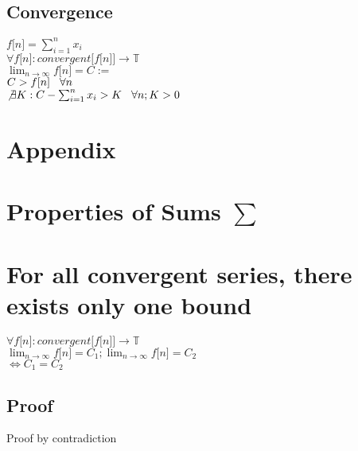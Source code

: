\documentclass[11pt]{article}
\begin{document}
\subsection{Convergence}
\begin{center}
$ f \lbrack n \rbrack = \sum_{i=1}^{n} x_i$
\\ \vspace{2mm}
$\forall f \lbrack n \rbrack : convergent \lbrack f \lbrack n \rbrack \rbrack \rightarrow \mathbb{T}$
\\ \vspace{2mm}
$ \lim_{n \rightarrow \infty} f \lbrack n \rbrack = C:=$
\\ \vspace{2mm}
$C >  f[n] \hspace{3mm} \forall n$
\\ \vspace{2mm}
$\not \exists K : C - \sum_{i=1}^{n} x_i > K \hspace{3mm} \forall n; K > 0$
\end{center}





\newpage
\section*{Appendix}




\section{Properties of Sums $\sum$}





\section{For all convergent series, there exists only one bound}
\begin{center}
$\forall f \lbrack n \rbrack : convergent \lbrack f \lbrack n \rbrack \rbrack \rightarrow \mathbb{T}$
\\ \vspace{2mm} 
$\lim_{n \rightarrow \infty} f \lbrack n \rbrack = C_1; \lim_{n \rightarrow \infty} f \lbrack n \rbrack = C_2$
\\ \vspace{2mm}
$\Longleftrightarrow C_1 = C_2$
\end{center}
\subsection{Proof}
Proof by contradiction
\end{document}
